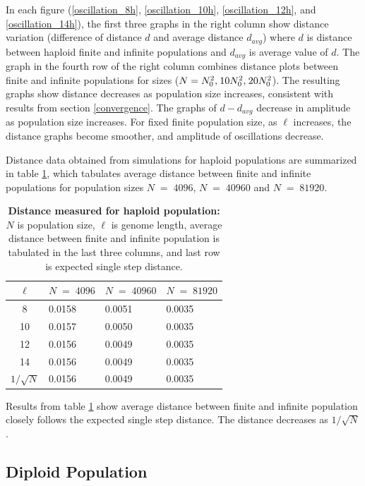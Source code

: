 In each figure (\ref{oscillation_8h}, \ref{oscillation_10h}, \ref{oscillation_12h}, 
and \ref{oscillation_14h}), the first three graphs in the right column show 
distance variation (difference of distance $d$ and average distance $d_{avg}$)  
where $d$ is distance between haploid finite and infinite populations and $d_{avg}$ is average value of $d$. 
The graph in the fourth row of the right column combines distance plots between finite and infinite populations for sizes 
($N = N_0^2, \hspace{0.01in}10N_0^2, \hspace{0.01in}20N_0^2$). The resulting graphs show distance decreases 
as population size increases, consistent with results from section \ref{convergence}. 
The graphs of $d-d_{avg}$ decrease in amplitude as population size increases. 
For fixed finite population size, as $\ell$ increases, the distance graphs become smoother, and amplitude of oscillations decrease. 

Distance data obtained from simulations for haploid populations are summarized in table \ref{tableDistanceOscHap},  
which tabulates average distance between finite and infinite populations 
for population sizes $N \;=\; 4096 $, $N \;=\; 40960 $ and $N \;=\; 81920 $.
\begin{table}[h]
\caption{\textbf{Distance measured for haploid population:} $N$ is population size, $\ell$ is genome length, 
average distance between finite and infinite population is tabulated in the last three columns, and last row is expected single step distance.}
\centering
\begin{tabularx}{0.75\textwidth}{ c *{3}{X}}
\toprule
$\ell$ & $N \;=\; 4096 $ & $N \;=\; 40960 $ & $N \;=\; 81920 $\\
\midrule
8 & 0.0158 & 0.0051 & 0.0035 \\
10 & 0.0157 & 0.0050 & 0.0035 \\ 
12 & 0.0156 & 0.0049 & 0.0035 \\
14 & 0.0156 & 0.0049 & 0.0035 \\ 
\midrule
$1/\sqrt{N}$ & 0.0156 & 0.0049 & 0.0035 \\
\bottomrule
\end{tabularx}
\label{tableDistanceOscHap}
\end{table}

Results from table \ref{tableDistanceOscHap} show average distance between finite and infinite population closely follows 
the expected single step distance. The distance decreases as $1/\sqrt{N}$.

\clearpage
\subsection{Diploid Population}


